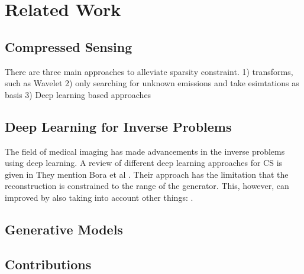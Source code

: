
\chapter{Related Work}\label{chapter:related_work}

\section{Compressed Sensing}
There are three main approaches to alleviate sparsity constraint.
1) transforms, such as Wavelet
2) only searching for unknown emissions and take esimtations as basis
3) Deep learning based approaches

\section{Deep Learning for Inverse Problems}
The field of medical imaging has made advancements in the inverse problems using deep learning.
A review of different deep learning approaches for CS is given in \parencite{ReviewCSUsingAI}
They mention Bora et al \parencite{CSUsingAI}.
Their approach has the limitation that the reconstruction is constrained to the range of the generator.
This, however, can improved by also taking into account other things: \parencite{SparseCSUsingAI}.

\section{Generative Models}

\section{Contributions}

